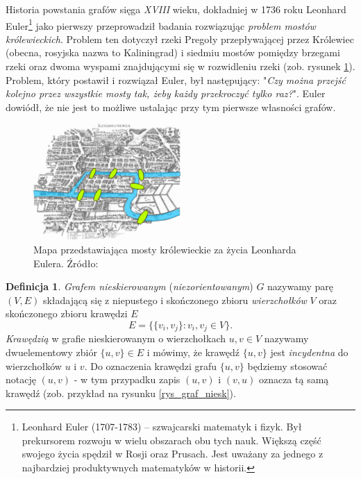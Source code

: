 \documentclass[12pt,a4paper]{book}
\theoremstyle{definition}
\newtheorem{de}{Definicja}[chapter]
\numberwithin{equation}{chapter}
\begin{document}
Historia powstania grafów sięga \textit{XVIII} wieku, dokładniej w 1736 roku Leonhard Euler\footnote{Leonhard Euler (1707-1783) – szwajcarski matematyk i fizyk. Był prekursorem rozwoju w wielu obszarach obu tych nauk. Większą część swojego życia spędził w Rosji oraz Prusach. Jest uważany za jednego z najbardziej produktywnych matematyków w historii.} jako pierwszy przeprowadził badania rozwiązując \textit{problem mostów królewieckich}.
Problem ten dotyczył rzeki Pregoły przepływającej przez Królewiec (obecna, rosyjska nazwa to Kaliningrad) i siedmiu mostów pomiędzy brzegami rzeki oraz dwoma wyspami znajdującymi się w rozwidleniu rzeki (zob. rysunek \ref{rys_mosty}). Problem, który postawił i rozwiązał Euler, był następujący: "\textit{Czy można przejść kolejno przez wszystkie mosty tak, żeby każdy przekroczyć tylko raz?}".
Euler dowiódł, że nie jest to możliwe ustalając przy tym pierwsze własności grafów.

\begin{figure}[H]
\centering
\includegraphics[width=0.5\textwidth]{images/bridges.pdf}
\caption{Mapa przedstawiająca mosty królewieckie za życia Leonharda Eulera. Źródło: \cite{wiki_mosty}}
\label{rys_mosty}
\end{figure}

\begin{de}
\textit{Grafem nieskierowanym} (\textit{niezorientowanym}) $G$ nazywamy parę $(V, E)$ składającą się z niepustego i skończonego zbioru \textit{wierzchołków} $V$ oraz skończonego zbioru krawędzi $E$
$$
E = \big\{ \{v_{i}, v_{j}\}\colon v_i, v_j\in V\big\}.
$$
\textit{Krawędzią} w grafie nieskierowanym o wierzchołkach $u, v\in V$ nazywamy dwuelementowy  zbiór $\{u, v\} \in E$ i mówimy, że krawędź $\{u, v\}$ jest \textit{incydentna} do wierzchołków $u$ i $v$. Do oznaczenia krawędzi grafu $\{u,v\}$ będziemy stosować notację $(u,v)$ - w tym przypadku zapis $(u,v)$ i $(v,u)$ oznacza tą samą krawędź (zob. przykład na rysunku \ref{rys_graf_niesk}).
\end{de}
\end{document}
